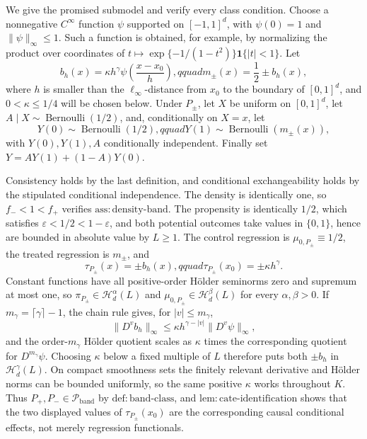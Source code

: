 We give the promised submodel and verify every class condition.  Choose a nonnegative \(C^\infty\) function \(\psi\) supported on \([-1,1]^d\), with \(\psi(0)=1\) and \(\|\psi\|_\infty\leq1\).  Such a function is obtained, for example, by normalizing the product over coordinates of \(t\mapsto \exp\{-1/(1-t^2)\}\mathbf 1\{|t|<1\}\).  Let
\[
 b_h(x)=\kappa h^\gamma\psi\left(\frac{x-x_0}{h}\right),qquad
 m_\pm(x)=\frac12\pm b_h(x),
\]
where \(h\) is smaller than the \(\ell_\infty\)-distance from \(x_0\) to the boundary of \([0,1]^d\), and \(0<\kappa\leq1/4\) will be chosen below.  Under \(P_\pm\), let \(X\) be uniform on \([0,1]^d\), let \(A\mid X\sim\operatorname{Bernoulli}(1/2)\), and, conditionally on \(X=x\), let
\[
 Y(0)\sim\operatorname{Bernoulli}(1/2),qquad
 Y(1)\sim\operatorname{Bernoulli}(m_\pm(x)),
\]
with \(Y(0),Y(1),A\) conditionally independent.  Finally set \(Y=AY(1)+(1-A)Y(0)\).

Consistency holds by the last definition, and conditional exchangeability holds by the stipulated conditional independence.  The density is identically one, so \(f_{-}<1<f_{+}\) verifies \(\mathrm{ass:density\mbox{-}band}\).  The propensity is identically \(1/2\), which satisfies \(\varepsilon<1/2<1-\varepsilon\), and both potential outcomes take values in \(\{0,1\}\), hence are bounded in absolute value by \(L\geq1\).  The control regression is \(\mu_{0,P_\pm}\equiv1/2\), the treated regression is \(m_\pm\), and
\[
 \tau_{P_\pm}(x)=\pm b_h(x),qquad
 \tau_{P_\pm}(x_0)=\pm\kappa h^\gamma.
\]
Constant functions have all positive-order H\"older seminorms zero and supremum at most one, so \(\pi_{P_\pm}\in\mathcal H_d^\alpha(L)\) and \(\mu_{0,P_\pm}\in\mathcal H_d^\beta(L)\) for every \(\alpha,\beta>0\).  If \(m_\gamma=\lceil\gamma\rceil-1\), the chain rule gives, for \(|v|\leq m_\gamma\),
\[
 \|D^v b_h\|_\infty\leq \kappa h^{\gamma-|v|}\|D^v\psi\|_\infty,
\]
and the order-\(m_\gamma\) H\"older quotient scales as \(\kappa\) times the corresponding quotient for \(D^{m_\gamma}\psi\).  Choosing \(\kappa\) below a fixed multiple of \(L\) therefore puts both \(\pm b_h\) in \(\mathcal H_d^\gamma(L)\).  On compact smoothness sets the finitely relevant derivative and H\"older norms can be bounded uniformly, so the same positive \(\kappa\) works throughout \(K\).  Thus \(P_+,P_-\in\mathcal P_{\mathrm{band}}\) by \(\mathrm{def:band\mbox{-}class}\), and \(\mathrm{lem:cate\mbox{-}identification}\) shows that the two displayed values of \(\tau_{P_\pm}(x_0)\) are the corresponding causal conditional effects, not merely regression functionals.

